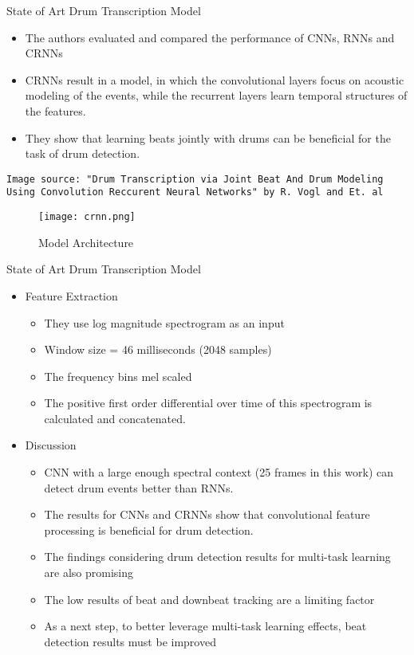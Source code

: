\begin{frame}[t,fragile]{State of Art Drum Transcription Model}
\begin{itemize}

\item The authors evaluated and compared the performance of CNNs, RNNs and CRNNs
\item CRNNs result in a model, in which the convolutional layers focus on acoustic modeling of the events, while the recurrent layers learn temporal structures of the features.
\item They show that learning beats jointly with drums can be beneficial for the task of drum detection.

\end{itemize}
\tiny{\texttt{Image source: "Drum Transcription via Joint Beat And Drum Modeling Using Convolution Reccurent Neural Networks" by R. Vogl and Et. al}}
\begin{figure}[h!]
  \texttt{[image: crnn.png]}
  \caption{Model Architecture}
  \label{}
\end{figure}

\end{frame}

\begin{frame}[t,fragile]{State of Art Drum Transcription Model}
\begin{itemize}

\item Feature Extraction
  
  \begin{itemize}
    \item They use log magnitude spectrogram as an input
    \item Window size = 46 milliseconds (2048 samples)
    \item The frequency bins mel scaled
    \item The positive first order differential over time of this spectrogram is calculated and concatenated.
  \end{itemize}  

\item Discussion
  \begin{itemize}
    \item CNN with a large enough spectral context (25 frames in this work) can detect drum events better than RNNs.
    \item The results for CNNs and CRNNs show that convolutional feature processing is beneficial for drum detection.
    \item The findings considering drum detection results for multi-task learning are also promising
    \item The low results of beat and downbeat tracking are a limiting factor
    \item As a next step, to better leverage multi-task learning effects, beat detection results must be improved
  \end{itemize}  

\end{itemize}

\end{frame}


